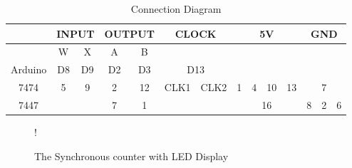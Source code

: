 \documentclass[journal,12pt,twocolumn]{IEEEtran}
\begin{document}
\begin{enumerate}[1.]
\begin{table}[h!]
	\begin{center}
		\begin{tabular}{ |c|c|c|c|c|c|c|c|c|c|c|c|c|c| } 
			\hline
			\multicolumn{1}{|c|}{} &\multicolumn{2}{|c|}{\textbf{INPUT}} & \multicolumn{2}{|c|}{\textbf{OUTPUT}} &\multicolumn{2}{|c|}{\textbf{CLOCK}} &\multicolumn{4}{|c|}{\textbf{5V}} &\multicolumn{3}{|c|}{\textbf{GND}}\\
			\hline
			\multicolumn{1}{|c|}{} & \multicolumn{1}{|c|}{W} & \multicolumn{1}{|c|}{X} & \multicolumn{1}{|c|}{A} & \multicolumn{1}{|c|}{B} & \multicolumn{2}{|c|}{} & \multicolumn{4}{|c|}{} & \multicolumn{3}{|c|}{}   \\
			\hline
			\multicolumn{1}{|c|}{Arduino} & \multicolumn{1}{|c|}{D8} & \multicolumn{1}{|c|}{D9} & \multicolumn{1}{|c|}{D2} & \multicolumn{1}{|c|}{D3} & \multicolumn{2}{|c|}{D13} & \multicolumn{4}{|c|}{} & \multicolumn{3}{|c|}{}\\
			\hline
			\multicolumn{1}{|c|}{7474} & \multicolumn{1}{|c|}{5} & \multicolumn{1}{|c|}{9} & \multicolumn{1}{|c|}{2} & \multicolumn{1}{|c|}{12} & \multicolumn{1}{|c|}{CLK1} & \multicolumn{1}{|c|}{CLK2} & \multicolumn{1}{|c|}{1} & \multicolumn{1}{|c|}{4} & \multicolumn{1}{|c|}{10} & \multicolumn{1}{|c|}{13} & \multicolumn{3}{|c|}{7} \\
			\hline
			\multicolumn{1}{|c|}{7447} & \multicolumn{2}{|c|}{} & \multicolumn{1}{|c|}{7} & \multicolumn{1}{|c|}{1} & \multicolumn{2}{|c|}{} & \multicolumn{4}{|c|}{16} & \multicolumn{1}{|c|}{8} & \multicolumn{1}{|c|}{2} & \multicolumn{1}{|c|}{6}\\
			\hline
		\end{tabular}
		\caption{Connection Diagram}
		\label{table:Connection_table}
	\end{center}
\end{table}

\begin{figure}[!h]
	\begin{center}
\resizebox {\columnwidth} {!} {
  
}
\end{center}
\caption{The Synchronous counter with LED Display}
\vspace{128in}
\label{fig:dec_counter}
\end{figure}

\end{enumerate}



	
	
	
%		

\end{document}
